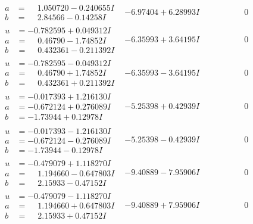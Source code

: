 \documentclass[1p]{elsarticle_modified}
\theoremstyle{definition}
\begin{document}
$$\begin{array}{c|c|c}
\begin{aligned}
a &= \phantom{-}1.050720 - 0.240655 I \\
b &= \phantom{-}2.84566 - 0.14258 I\end{aligned}
 & -6.97404 + 6.28993 I & \phantom{-0.000000 } 0 \\ \hline\begin{aligned}
u &= -0.782595 + 0.049312 I \\
a &= \phantom{-}0.46790 - 1.74852 I \\
b &= \phantom{-}0.432361 - 0.211392 I\end{aligned}
 & -6.35993 + 3.64195 I & \phantom{-0.000000 } 0 \\ \hline\begin{aligned}
u &= -0.782595 - 0.049312 I \\
a &= \phantom{-}0.46790 + 1.74852 I \\
b &= \phantom{-}0.432361 + 0.211392 I\end{aligned}
 & -6.35993 - 3.64195 I & \phantom{-0.000000 } 0 \\ \hline\begin{aligned}
u &= -0.017393 + 1.216130 I \\
a &= -0.672124 + 0.276089 I \\
b &= -1.73944 + 0.12978 I\end{aligned}
 & -5.25398 + 0.42939 I & \phantom{-0.000000 } 0 \\ \hline\begin{aligned}
u &= -0.017393 - 1.216130 I \\
a &= -0.672124 - 0.276089 I \\
b &= -1.73944 - 0.12978 I\end{aligned}
 & -5.25398 - 0.42939 I & \phantom{-0.000000 } 0 \\ \hline\begin{aligned}
u &= -0.479079 + 1.118270 I \\
a &= \phantom{-}1.194660 - 0.647803 I \\
b &= \phantom{-}2.15933 - 0.47152 I\end{aligned}
 & -9.40889 - 7.95906 I & \phantom{-0.000000 } 0 \\ \hline\begin{aligned}
u &= -0.479079 - 1.118270 I \\
a &= \phantom{-}1.194660 + 0.647803 I \\
b &= \phantom{-}2.15933 + 0.47152 I\end{aligned}
 & -9.40889 + 7.95906 I & \phantom{-0.000000 } 0 \\ \hline\begin{aligned}

\end{aligned}
\end{array}$$
\end{document}
